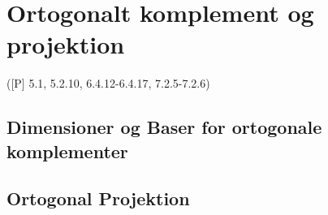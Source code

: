 \newpage
\chapter{Ortogonalt komplement og projektion}
([P] 5.1, 5.2.10, 6.4.12-6.4.17, 7.2.5-7.2.6)

\section{Dimensioner og Baser for ortogonale komplementer}


\section{Ortogonal Projektion}


